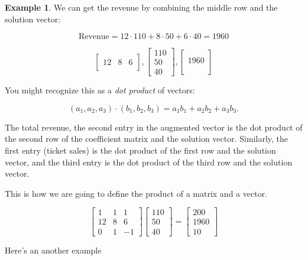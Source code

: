 \documentclass[
]{book}
\theoremstyle{definition}
\theoremstyle{definition}
\newtheorem{example}{Example}[chapter]
\theoremstyle{definition}
\theoremstyle{definition}
\theoremstyle{remark}
\begin{document}
\begin{examplebox}
\begin{example}
We can get the revenue by combining the middle row and the solution vector:

\[\text{Revenue} = 12\cdot110+8\cdot 50+6\cdot 40=1960\]

\[\begin{bmatrix}&&\\12 & 8 & 6\\ &  &  \end{bmatrix},\begin{bmatrix} 110\\50\\40\end{bmatrix},\begin{bmatrix} \\1960\\ \\ \end{bmatrix}\]

You might recognize this as a \emph{dot product} of vectors:

\[(a_1,a_2,a_3)\cdot (b_1,b_2,b_3)=a_1b_1+a_2b_2+a_3b_3.\]

The total revenue, the second entry in the augmented vector is the dot product of the second row of the coefficient matrix and the solution vector. Similarly, the first entry (ticket sales) is the dot product of the first row and the solution vector, and the third entry is the dot product of the third row and the solution vector.

This is how we are going to define the product of a matrix and a vector.

\[\begin{bmatrix}1&1&1\\12 & 8 & 6\\0 & 1 & -1 \end{bmatrix}\begin{bmatrix} 110\\50\\40\end{bmatrix}=\begin{bmatrix} 200\\1960\\10\end{bmatrix}\]
\end{example}

\end{examplebox}

Here's an another example
\end{document}
